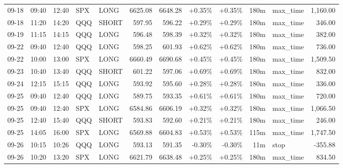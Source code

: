 \documentclass[11pt,a4paper,twoside]{article}
\begin{document}
\begin{center}
\begin{longtable}{>{\color{txtmain}}l l l l l r r r r r >{\color{txtmain}}l r}
09-18 & 09:40 & 12:40 & SPX & LONG & 6625.08 & 6648.28 & \textcolor{wingreen}{+0.35\%} & \textcolor{wingreen}{+0.35\%} & 180m & max\_time & \textcolor{wingreen}{1,160.00} \\
09-18 & 11:20 & 14:20 & QQQ & SHORT & 597.95 & 596.22 & \textcolor{wingreen}{+0.29\%} & \textcolor{wingreen}{+0.29\%} & 180m & max\_time & \textcolor{wingreen}{346.00} \\
09-19 & 11:15 & 14:15 & QQQ & LONG & 596.48 & 598.39 & \textcolor{wingreen}{+0.32\%} & \textcolor{wingreen}{+0.32\%} & 180m & max\_time & \textcolor{wingreen}{382.00} \\
09-22 & 09:40 & 12:40 & QQQ & LONG & 598.25 & 601.93 & \textcolor{wingreen}{+0.62\%} & \textcolor{wingreen}{+0.62\%} & 180m & max\_time & \textcolor{wingreen}{736.00} \\
09-22 & 10:00 & 13:00 & SPX & LONG & 6660.49 & 6690.68 & \textcolor{wingreen}{+0.45\%} & \textcolor{wingreen}{+0.45\%} & 180m & max\_time & \textcolor{wingreen}{1,509.50} \\
09-23 & 10:40 & 13:40 & QQQ & SHORT & 601.22 & 597.06 & \textcolor{wingreen}{+0.69\%} & \textcolor{wingreen}{+0.69\%} & 180m & max\_time & \textcolor{wingreen}{832.00} \\
09-24 & 12:15 & 15:15 & QQQ & LONG & 593.92 & 595.60 & \textcolor{wingreen}{+0.28\%} & \textcolor{wingreen}{+0.28\%} & 180m & max\_time & \textcolor{wingreen}{336.00} \\
09-25 & 09:40 & 12:40 & QQQ & LONG & 589.75 & 593.35 & \textcolor{wingreen}{+0.61\%} & \textcolor{wingreen}{+0.61\%} & 180m & max\_time & \textcolor{wingreen}{720.00} \\
09-25 & 09:40 & 12:40 & SPX & LONG & 6584.86 & 6606.19 & \textcolor{wingreen}{+0.32\%} & \textcolor{wingreen}{+0.32\%} & 180m & max\_time & \textcolor{wingreen}{1,066.50} \\
09-25 & 12:40 & 15:40 & QQQ & SHORT & 593.83 & 592.60 & \textcolor{wingreen}{+0.21\%} & \textcolor{wingreen}{+0.21\%} & 180m & max\_time & \textcolor{wingreen}{246.00} \\
09-25 & 14:05 & 16:00 & SPX & LONG & 6569.88 & 6604.83 & \textcolor{wingreen}{+0.53\%} & \textcolor{wingreen}{+0.53\%} & 115m & max\_time & \textcolor{wingreen}{1,747.50} \\
09-26 & 10:15 & 10:26 & QQQ & LONG & 593.13 & 591.35 & \textcolor{lossred}{-0.30\%} & \textcolor{lossred}{-0.30\%} & 11m & stop & \textcolor{lossred}{-355.88} \\
09-26 & 10:20 & 13:20 & SPX & LONG & 6621.79 & 6638.48 & \textcolor{wingreen}{+0.25\%} & \textcolor{wingreen}{+0.25\%} & 180m & max\_time & \textcolor{wingreen}{834.50} \\

\end{longtable}
\end{center}
\end{document}
